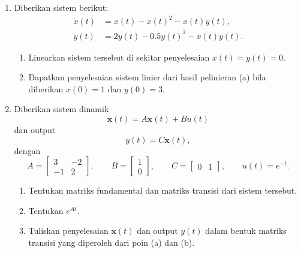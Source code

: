 \documentclass[11pt,a4paper]{article}
\newcommand{\xx}{\mathbf{x}}
\begin{document}
\begin{enumerate}
  \item Diberikan sistem berikut:
        \[
          \begin{aligned}
            \dot{x}(t)&=x(t)-x(t)^2-x(t)y(t),\\
            \dot{y}(t)&=2y(t)-0.5y(t)^2-x(t)y(t).
          \end{aligned}
        \]
        \begin{enumerate}
          \item Linearkan sistem tersebut di sekitar penyelesaian $x(t)=y(t)=0$.
          \item Dapatkan penyelesaian sistem linier dari hasil pelinieran (a)
                bila diberikan $x(0)=1$ dan $y(0)=3$.
        \end{enumerate}

  \item Diberikan sistem dinamik
        \[
          \dot{\xx}(t)=A\xx(t)+Bu(t)
        \]
        dan output
        \[
          y(t)=C\xx(t),
        \]
        dengan
        \[
          A=\begin{bmatrix}3&-2\\-1&2\end{bmatrix},\qquad
          B=\begin{bmatrix}1\\0\end{bmatrix},\qquad
          C=\begin{bmatrix}0&1\end{bmatrix},\qquad u(t)=e^{-t}.
        \]
        \begin{enumerate}
          \item Tentukan matriks fundamental dan matriks transisi dari sistem tersebut.
          \item Tentukan $e^{At}$.
          \item Tuliskan penyelesaian $\xx(t)$ dan output $y(t)$ dalam bentuk matriks transisi
                yang diperoleh dari poin (a) dan (b).
        \end{enumerate}


\end{enumerate}
\end{document}
